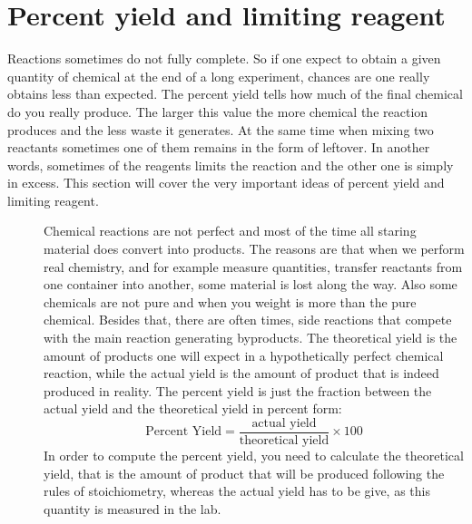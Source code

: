 \documentclass[main.tex]{subfiles}
\begin{document}
\section{Percent yield and limiting reagent}
Reactions sometimes do not fully complete. So if one expect to obtain a given quantity of chemical at the end of a long experiment, chances are one really obtains less than expected. The percent yield tells how much of the final chemical do you really produce. The larger this value the more chemical the reaction produces and the less waste it generates. At the same time when mixing two reactants sometimes one of them remains in the form of leftover. In another words, sometimes of the reagents limits the reaction and the other one is simply in excess. This section will cover the very important ideas of percent yield and limiting reagent.
\sloppy 
\begin{description}

\item[] 
Chemical reactions are not perfect and most of the time all staring material does convert into products. The reasons are that when we perform real chemistry, and for example measure quantities, transfer reactants from one container into another, some material is lost along the way. Also some chemicals are not pure and when you weight is more than the pure chemical. Besides that, there are often times, side reactions that compete with the main reaction generating byproducts. The theoretical yield is the amount of products one will expect in a hypothetically perfect chemical reaction, while the actual yield is the amount of product that is indeed produced in reality. The percent yield is just the fraction between the actual yield and the theoretical yield in percent form:
\begin{equation*}
 \text{Percent Yield}=\dfrac{\text{actual yield}}{\text{theoretical yield}}\times 100
\end{equation*}
In order to compute the percent yield, you need to calculate the theoretical yield, that is the amount of product that will be produced following the rules of stoichiometry, whereas the actual yield has to be give, as this quantity is measured in the lab.


\end{description}
\end{document}
